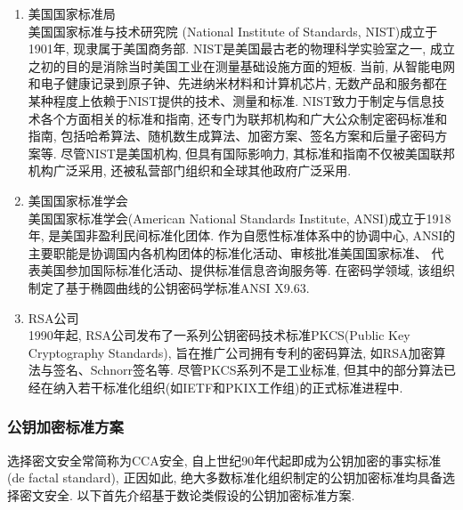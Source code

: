 \begin{enumerate}
\item 美国国家标准局\\
    美国国家标准与技术研究院 (National Institute of Standards, NIST)成立于1901年, 现隶属于美国商务部. 
    NIST是美国最古老的物理科学实验室之一, 成立之初的目的是消除当时美国工业在测量基础设施方面的短板. 当前, 从智能电网和电子健康记录到原子钟、先进纳米材料和计算机芯片, 
    无数产品和服务都在某种程度上依赖于NIST提供的技术、测量和标准. NIST致力于制定与信息技术各个方面相关的标准和指南, 
    还专门为联邦机构和广大公众制定密码标准和指南, 包括哈希算法、随机数生成算法、加密方案、签名方案和后量子密码方案等.
    尽管NIST是美国机构, 但具有国际影响力, 其标准和指南不仅被美国联邦机构广泛采用, 还被私营部门组织和全球其他政府广泛采用. 

\item 美国国家标准学会\\
    美国国家标准学会(American National Standards Institute, ANSI)成立于1918年, 是美国非盈利民间标准化团体.
    作为自愿性标准体系中的协调中心, ANSI的主要职能是协调国内各机构团体的标准化活动、审核批准美国国家标准、
    代表美国参加国际标准化活动、提供标准信息咨询服务等. 在密码学领域, 该组织制定了基于椭圆曲线的公钥密码学标准ANSI X9.63. 

\item RSA公司\\
    1990年起, RSA公司发布了一系列公钥密码技术标准PKCS(Public Key Cryptography Standards), 
    旨在推广公司拥有专利的密码算法, 如RSA加密算法与签名、Schnorr签名等. 
    尽管PKCS系列不是工业标准, 但其中的部分算法已经在纳入若干标准化组织(如IETF和PKIX工作组)的正式标准进程中.
\end{enumerate}


\subsubsection{公钥加密标准方案}
选择密文安全常简称为CCA安全, 自上世纪90年代起即成为公钥加密的事实标准(de factal standard), 
正因如此, 绝大多数标准化组织制定的公钥加密标准均具备选择密文安全. 以下首先介绍基于数论类假设的公钥加密标准方案. 

